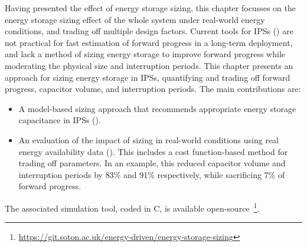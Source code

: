 Having presented the effect of energy storage sizing, this chapter focusses on the energy storage sizing effect of the whole system under real-world energy conditions, and trading off multiple design factors. 
Current tools for IPSs () are not practical for fast estimation of forward progress in a long-term deployment, and lack a method of sizing energy storage to improve forward progress while moderating the physical size and interruption periods. 
This chapter presents an approach for sizing energy storage in IPSs, quantifying and trading off forward progress, capacitor volume, and interruption periods. 
The main contributions are:
\begin{itemize}
    \item A model-based sizing approach that recommends appropriate energy storage capacitance in IPSs ().
    \item An evaluation of the impact of sizing in real-world conditions using real energy availability data (). 
    This includes a cost function-based method for trading off parameters. 
    In an example, this reduced capacitor volume and interruption periods by 83\% and 91\% respectively, while sacrificing 7\% of forward progress.
\end{itemize}

The associated simulation tool, coded in C, is available open-source~\footnote{\url{https://git.soton.ac.uk/energy-driven/energy-storage-sizing}}. 
